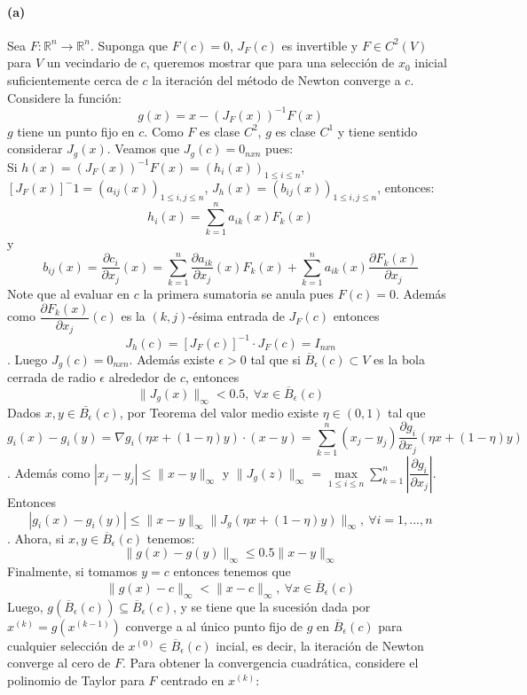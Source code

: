 \paragraph{(a)}
Sea $F:\mathbb{R}^n\longrightarrow\mathbb{R}^n$. Suponga que $F(c)=0$, $J_F(c)$ es invertible y $F\in C^2(V)$ para $V$ un vecindario de $c$, queremos mostrar que para una selecci\'on de $x_0$ inicial suficientemente cerca de $c$ la iteraci\'on del m\'etodo de Newton converge a $c$.
Considere la función:
$$g(x)=x-(J_F(x))^{-1}F(x)$$
$g$ tiene un punto fijo en $c$. Como $F$ es clase $C^2$, $g$ es clase $C^1$ y tiene sentido considerar $J_g(x)$.
Veamos que $J_g(c)=0_{nxn}$ pues:\\
Si $h(x)=(J_F(x))^{-1}F(x)=(h_i(x))_{1\leq i \leq n}$,  $[J_F(x)]^-1=(a_{ij}(x))_{1\leq i,j \leq n}$, $J_h(x)=(b_{ij}(x))_{1\leq i,j \leq n}$, entonces:
$$h_i(x)=\sum_{k=1}^{n}a_{ik}(x)F_k(x)$$ y
$$b_{ij}(x)=\dfrac{\partial c_i}{\partial x_j}(x)=\sum_{k=1}^{n}\dfrac{\partial a_{ik}}{\partial x_j}(x)F_k(x)+\sum_{k=1}^{n}a_{ik}(x)\dfrac{\partial F_k(x)}{\partial x_j}$$
Note que al evaluar en $c$ la primera sumatoria se anula pues $F(c)=0$. Además como $\dfrac{\partial F_k(x)}{\partial x_j}(c)$ es la $(k,j)$-\'esima entrada de $J_F(c)$ entonces $$J_h(c)=[J_F(c)]^{-1}\cdot J_F(c)=I_{nxn}$$. Luego $J_g(c)=0_{nxn}$.
Adem\'as existe $\epsilon>0$ tal que si $\overline{B}_\epsilon(c)\subset V$ es la bola cerrada de radio $\epsilon$ alrededor de $c$, entonces 
$$\|J_g(x)\|_\infty<0.5,\ \forall x\in\overline{B}_\epsilon(c)$$
Dados $x,y\in\bar{B_\epsilon}(c)$, por Teorema del valor medio existe $\eta\in(0,1)$ tal que 
$$g_i(x)-g_i(y)=\nabla g_i(\eta x+(1-\eta)y)\cdot(x-y)=\sum_{k=1}^{n}(x_j-y_j)\dfrac{\partial g_i}{\partial x_j}(\eta x + (1-\eta)y)$$.
Adem\'as como $|x_j-y_j|\leq\|x-y\|_\infty$ y $\|J_g(z)\|_\infty=\underset{1\leq i\leq n}{\max}\sum_{k=1}^{n}\left |\dfrac{\partial g_i}{\partial x_j}\right|$. Entonces
$$|g_i(x)-g_i(y)|\leq\|x-y\|_\infty\|J_g(\eta x+(1-\eta)y)\|_\infty,\ \forall i=1,...,n$$.
Ahora, si $x,y\in\overline{B}_\epsilon(c)$ tenemos:
$$\|g(x)-g(y)\|_\infty\leq 0.5\|x-y\|_\infty$$
Finalmente, si tomamos $y=c$ entonces tenemos que
$$\|g(x)-c\|_\infty < \|x-c\|_\infty,\ \forall x\in\overline{B}_\epsilon(c)$$
Luego, $g(\overline{B}_\epsilon(c))\subseteq\overline{B}_\epsilon(c)$, y se tiene que la sucesi\'on dada por $x^{(k)}=g(x^{(k-1)})$ converge a al \'unico punto fijo de $g$ en $\overline{B}_\epsilon(c)$ para cualquier selecci\'on de $x^{(0)}\in\overline{B}_\epsilon(c)$ incial, es decir, la iteraci\'on de Newton converge al cero de $F$. Para obtener la convergencia cuadr\'atica, considere el polinomio de Taylor para $F$ centrado en $x^{(k)}$:
